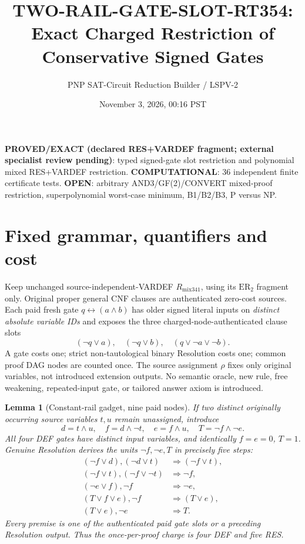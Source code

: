 \documentclass[11pt]{article}
\title{TWO-RAIL-GATE-SLOT-RT354: Exact Charged Restriction of Conservative Signed Gates}
\author{PNP SAT-Circuit Reduction Builder / LSPV-2}
\date{November 3, 2026, 00:16 PST}
\newtheorem{lemma}{Lemma}
\begin{document}
\maketitle
\noindent\textbf{PROVED/EXACT (declared RES+VARDEF fragment; external specialist review pending)}: typed signed-gate slot restriction and polynomial mixed RES+VARDEF restriction. \textbf{COMPUTATIONAL}: 36 independent finite certificate tests. \textbf{OPEN}: arbitrary AND3/GF(2)/CONVERT mixed-proof restriction, superpolynomial worst-case minimum, B1/B2/B3, P versus NP.

\section*{Fixed grammar, quantifiers and cost}
Keep unchanged source-independent-VARDEF $R_{\mathrm{mix341}}$, using its $\mathrm{ER}_2$ fragment only. Original proper general CNF clauses are authenticated zero-cost sources. Each paid fresh gate $q\leftrightarrow(a\wedge b)$ has older signed literal inputs on \emph{distinct absolute variable IDs} and exposes the three charged-node-authenticated clause slots
\[
(\neg q\vee a),\quad(\neg q\vee b),\quad(q\vee\neg a\vee\neg b).
\]
A gate costs one; strict non-tautological binary Resolution costs one; common proof DAG nodes are counted once. The source assignment $\rho$ fixes only original variables, not introduced extension outputs. No semantic oracle, new rule, free weakening, repeated-input gate, or tailored answer axiom is introduced.

\begin{lemma}[Constant-rail gadget, nine paid nodes]
If two distinct originally occurring source variables $t,u$ remain unassigned, introduce
\[
d=t\wedge u,\quad f=d\wedge\neg t,\quad e=f\wedge u,\quad T=\neg f\wedge\neg e.
\]
All four DEF gates have distinct input variables, and identically $f=e=0$, $T=1$. Genuine Resolution derives the units $\neg f,\neg e,T$ in precisely five steps:
\[
\begin{aligned}
(\neg f\vee d),(\neg d\vee t)&\Rightarrow(\neg f\vee t),\\
(\neg f\vee t),(\neg f\vee\neg t)&\Rightarrow\neg f,\\
(\neg e\vee f),\neg f&\Rightarrow\neg e,\\
(T\vee f\vee e),\neg f&\Rightarrow(T\vee e),\\
(T\vee e),\neg e&\Rightarrow T.
\end{aligned}
\]
Every premise is one of the authenticated paid gate slots or a preceding Resolution output. Thus the once-per-proof charge is four DEF and five RES.
\end{lemma}
\end{document}
